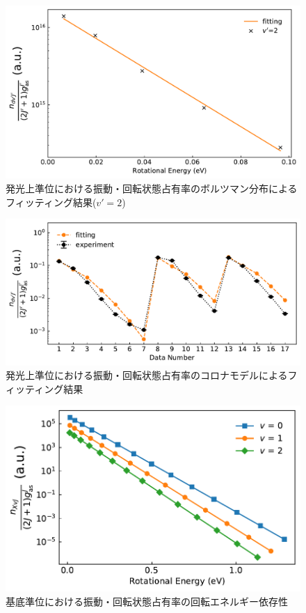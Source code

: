 \begin{figure}
    \centering
    \includegraphics[width=15cm]{pictures/upper-fitting-2.pdf}
    \caption{発光上準位における振動・回転状態占有率のボルツマン分布によるフィッティング結果($v'=2$)}
    \label{fig:upper-fitting-2}
\end{figure}

\begin{figure}
    \centering
    \includegraphics[width=15cm]{pictures/fitting-result.pdf}
    \caption{発光上準位における振動・回転状態占有率のコロナモデルによるフィッティング結果}
    \label{fig:fitting-result}
\end{figure}

\begin{figure}
    \centering
    \includegraphics[width=15cm]{pictures/ground-state-n.pdf}
    \caption{基底準位における振動・回転状態占有率の回転エネルギー依存性}
    \label{fig:ground-state-n}
\end{figure}

